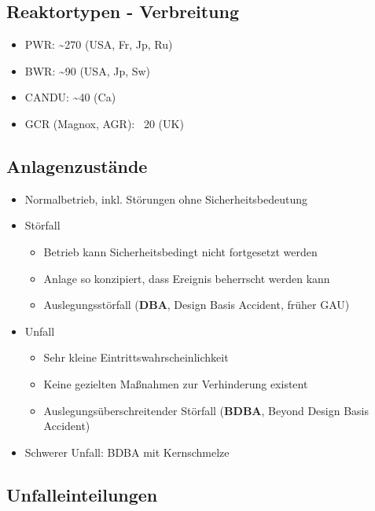 \documentclass[12pt]{article}
\begin{document}
\subsection{Reaktortypen - Verbreitung}
\begin{itemize}
	\item PWR: \textasciitilde 270 (USA, Fr, Jp, Ru)
	\item BWR: \textasciitilde 90 (USA, Jp, Sw)
	\item CANDU: \textasciitilde 40 (Ca)
	\item GCR (Magnox, AGR): ~20 (UK)
\end{itemize}

\subsection{Anlagenzustände}
\begin{itemize}
	\item Normalbetrieb, inkl. Störungen ohne Sicherheitsbedeutung
	\item Störfall
		\begin{itemize}
			\item Betrieb kann Sicherheitsbedingt nicht fortgesetzt werden
			\item Anlage so konzipiert, dass Ereignis beherrscht werden kann
			\item Auslegungsstörfall (\textbf{DBA}, Design Basis Accident, früher GAU)
		\end{itemize}
	\item Unfall
		\begin{itemize}
			\item Sehr kleine Eintrittswahrscheinlichkeit
			\item Keine gezielten Maßnahmen zur Verhinderung existent
			\item Auslegungsüberschreitender Störfall (\textbf{BDBA}, Beyond Design Basis Accident)
		\end{itemize}
	\item Schwerer Unfall: BDBA mit Kernschmelze
\end{itemize}

\subsection{Unfalleinteilungen}
\end{document}
